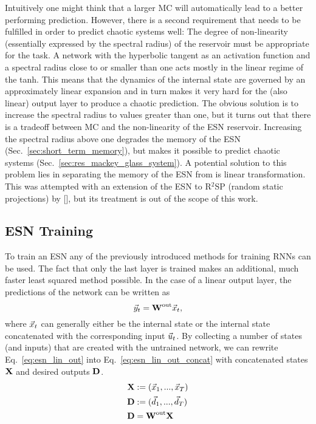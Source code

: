 Intuitively one might think that a larger MC will
automatically lead to a better performing prediction. However, there is a
second requirement that needs to be fulfilled in order to predict chaotic
systems well: The degree of non-linearity (essentially expressed by the
spectral radius) of the reservoir must be appropriate for the task.
A network with the hyperbolic tangent as an activation function and 
a spectral radius close to or smaller than one acts mostly in the
linear regime of the tanh. This means that the dynamics of the internal state
are governed by an approximately linear expansion and in turn makes it very
hard for the (also linear) output layer to produce a chaotic prediction.
The obvious solution is to increase the spectral radius to values greater than
one, but it turns out that there is a tradeoff between MC and the non-linearity
of the ESN reservoir. Increasing the spectral radius above one degrades the
memory of the ESN (Sec.~\ref{sec:short_term_memory}), but makes it possible
to predict chaotic systems (Sec.~\ref{sec:res_mackey_glass_system}).
A potential solution to this problem lies in separating the memory of the ESN
from is linear transformation. This was attempted with an extension of the ESN
to R$^2$SP (random static projections) by [\cite{butcher2013}], but its treatment
is out of the scope of this work.


\subsection{ESN Training}
\label{sub:esn_training}

To train an ESN any of the previously introduced methods for training RNNs can
be used. The fact that only the last layer is trained makes an additional, much
faster least squared method possible.  In the case of a linear output layer,
the predictions of the network can be written as
\begin{equation}
  \vec{y}_t = \boldsymbol{\textbf{W}}^{\text{out}} \vec{x}_t,
  \label{eq:esn_lin_out}
\end{equation}
where $\vec{x}_t$ can generally either be the internal state or the internal state
concatenated with the corresponding input $\vec{u}_t$.  By collecting a number of
states (and inputs) that are created with the untrained network, we can rewrite
Eq.~\ref{eq:esn_lin_out} into Eq.~\ref{eq:esn_lin_out_concat} with concatenated
states $\boldsymbol{\textbf{X}}$ and desired outputs $\boldsymbol{\textbf{D}}$.
\begin{align}
  \boldsymbol{\textbf{X}} &:= (\vec{x}_1, ..., \vec{x}_T) \\
  \boldsymbol{\textbf{D}} &:= (\vec{d}_1, ..., \vec{d}_T) \\
  \boldsymbol{\textbf{D}} &= \boldsymbol{\textbf{W}}^{\text{out}} \boldsymbol{\textbf{X}} \label{eq:esn_lin_out_concat}
\end{align}

